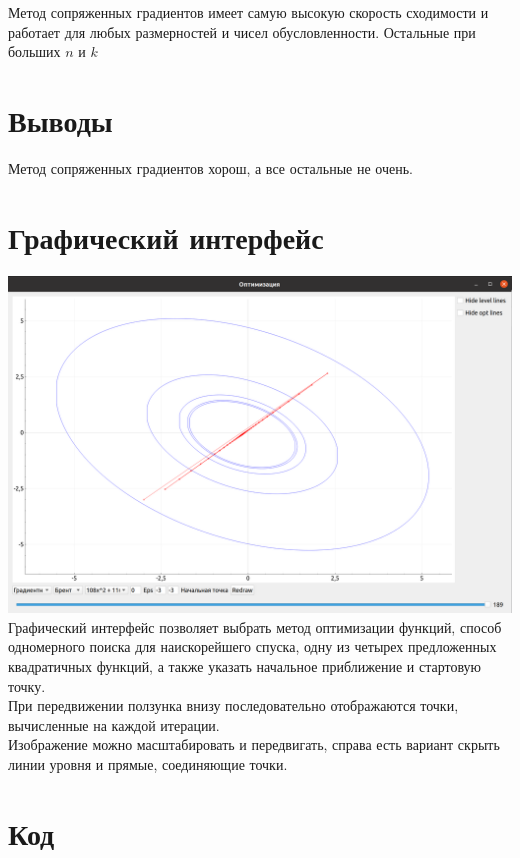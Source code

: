 	
	Метод сопряженных градиентов имеет самую высокую скорость сходимости и работает для любых размерностей и чисел обусловленности. 
	Остальные при больших $n$ и $k$
	
	\section{Выводы}
	Метод сопряженных градиентов хорош, а все остальные не очень.
	
	\newpage
	
	\section{Графический интерфейс}
	\includegraphics[scale=0.2]{img/gui.png}\\
	Графический интерфейс позволяет выбрать метод оптимизации функций, способ одномерного поиска для наискорейшего спуска, одну из четырех предложенных квадратичных функций, а также указать начальное приближение и стартовую точку.\\
	При передвижении ползунка внизу последовательно отображаются точки, вычисленные на каждой итерации.\\
	Изображение можно масштабировать и передвигать, справа есть вариант скрыть линии уровня и прямые, соединяющие точки.
	\newpage

	\section{Код}
	
